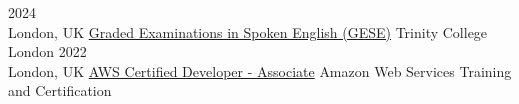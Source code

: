 \documentclass[9pt]{lib/developercv} %
\begin{document}


\begin{entrylist}
	\entry
		{2024\\\footnotesize{London, UK}}
		{\href{https://certificates.trinitycollege.com/02ccb77a-36ee-4b33-ab93-2c532f42bd3f}{Graded Examinations in Spoken English (GESE)}}
		{Trinity College London}
		{}
	\entry
		{2022\\\footnotesize{London, UK}}
		{\href{https://www.credly.com/badges/fa66c06c-1d71-4b9b-a1d0-2f8b2c99a35b/linked_in_profile}{AWS Certified Developer - Associate}}
		{Amazon Web Services Training and Certification}
		{}
\end{entrylist}









\end{document}
